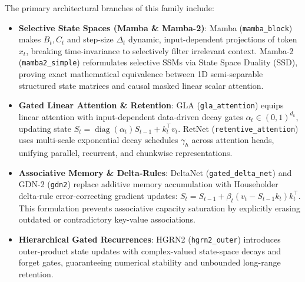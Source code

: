 \documentclass{article}
\begin{document}
The primary architectural branches of this family include:
\begin{itemize}
    \item \textbf{Selective State Spaces (Mamba \& Mamba-2)}: Mamba (\texttt{mamba\_block}) \citep{gu2022mamba} makes $B_t, C_t$ and step-size $\Delta_t$ dynamic, input-dependent projections of token $x_t$, breaking time-invariance to selectively filter irrelevant context. Mamba-2 (\texttt{mamba2\_simple}) \citep{dao2024mamba2} reformulates selective SSMs via State Space Duality (SSD), proving exact mathematical equivalence between 1D semi-separable structured state matrices and causal masked linear scalar attention.
    \item \textbf{Gated Linear Attention \& Retention}: GLA (\texttt{gla\_attention}) \citep{yang2023gated} equips linear attention with input-dependent data-driven decay gates $\alpha_t \in (0, 1)^{d_k}$, updating state $S_t = \operatorname{diag}(\alpha_t) S_{t-1} + k_t^\top v_t$. RetNet (\texttt{retentive\_attention}) \citep{sun2023retentive} uses multi-scale exponential decay schedules $\gamma_h$ across attention heads, unifying parallel, recurrent, and chunkwise representations.
    \item \textbf{Associative Memory \& Delta-Rules}: DeltaNet (\texttt{gated\_delta\_net}) \citep{schlag2021deltanet} and GDN-2 (\texttt{gdn2}) replace additive memory accumulation with Householder delta-rule error-correcting gradient updates: $S_t = S_{t-1} + \beta_t (v_t - S_{t-1} k_t) k_t^\top$. This formulation prevents associative capacity saturation by explicitly erasing outdated or contradictory key-value associations.
    \item \textbf{Hierarchical Gated Recurrences}: HGRN2 (\texttt{hgrn2\_outer}) \citep{dong2024hgrn2} introduces outer-product state updates with complex-valued state-space decays and forget gates, guaranteeing numerical stability and unbounded long-range retention.
\end{itemize}
\end{document}
